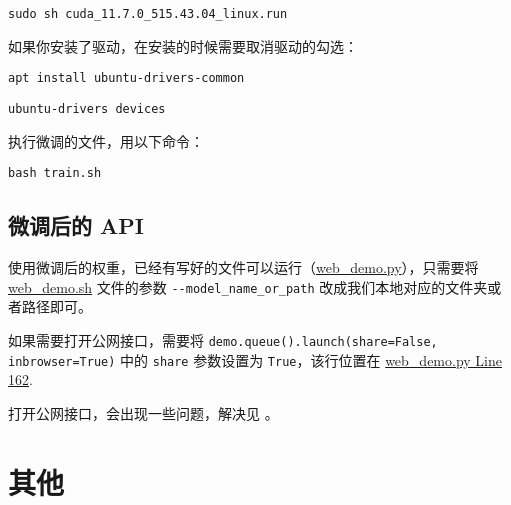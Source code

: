 \documentclass{article}
\begin{document}
\verb|sudo sh cuda_11.7.0_515.43.04_linux.run|

如果你安装了驱动，在安装的时候需要取消驱动的勾选：

\verb|apt install ubuntu-drivers-common|

\verb|ubuntu-drivers devices|

执行微调的文件，用以下命令：

\verb|bash train.sh|

\subsection{微调后的 API}
使用微调后的权重，已经有写好的文件可以运行（\href{https://github.com/THUDM/ChatGLM2-6B/blob/main/ptuning/web_demo.py}{web\_demo.py}），只需要将 \href{https://github.com/THUDM/ChatGLM2-6B/blob/main/ptuning/web_demo.sh}{web\_demo.sh} 文件的参数 \verb|--model_name_or_path| 改成我们本地对应的文件夹或者路径即可。

如果需要打开公网接口，需要将 \verb|demo.queue().launch(share=False, inbrowser=True)| 中的 \verb|share| 参数设置为 \verb|True|，该行位置在 \href{https://github.com/THUDM/ChatGLM2-6B/blob/3d0225f969d56c058f052f6800a21630d14a1184/ptuning/web_demo.py#L162}{web\_demo.py Line 162}.

打开公网接口，会出现一些问题，解决见 。
\section{其他}
\end{document}
